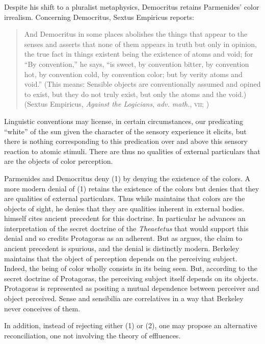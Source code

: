Despite his shift to a pluralist metaphysics, Democritus retains Parmenides' color irrealism. Concerning Democritus, Sextus Empiricus reports:
\begin{quote}
	And Democritus in some places abolishes the things that appear to the senses and asserts that none of them appears in truth but only in opinion, the true fact in things existent being the existence of atoms and void; for ``By convention,'' he says, ``is sweet, by convention bitter, by convention hot, by convention cold, by convention color; but by verity atoms and void.'' (This means: Sensible objects are conventionally assumed and opined to exist, but they do not truly exist, but only the atoms and the void.) (Sextus Empiricus, \emph{Against the Logicians}, \emph{adv. math.}, \textsc{vii}; \citealt[135--136]{Bury:1997uq}) 
\end{quote}
Linguistic conventions may license, in certain circumstances, our predicating ``white'' of the sun given the character of the sensory experience it elicits, but there is nothing corresponding to this predication over and above this sensory reaction to atomic stimuli. There are thus no qualities of external particulars that are the objects of color perception. 

Parmenides and Democritus deny (1) by denying the existence of the colors. A more modern denial of (1) retains the existence of the colors but denies that they are qualities of external particulars. Thus while \citet{Berkeley:1734fk} maintains that colors are the objects of sight, he denies that they are qualities inherent in external bodies. \citet{Berkeley:1744rm} himself cites ancient precedent for this doctrine. In particular he advances an interpretation of the secret doctrine of the \emph{Theaetetus} that would support this denial and so credits Protagoras as an adherent. But as \citet{Burnyeat:1982mz} argues, the claim to ancient precedent is spurious, and the denial is distinctly modern. Berkeley maintains that the object of perception depends on the perceiving subject. Indeed, the being of color wholly consists in its being seen. But, according to the secret doctrine of Protagoras, the perceiving subject itself depends on its objects. Protagoras is represented as positing a mutual dependence between perceiver and object perceived. Sense and sensibilia are correlatives in a way that Berkeley never conceives of them.

In addition, instead of rejecting either (1) or (2), one may propose an alternative reconciliation, one not involving the theory of effluences. 

